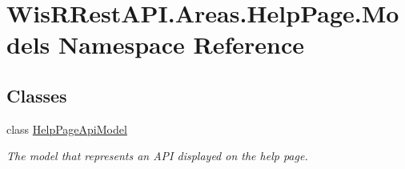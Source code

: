 \hypertarget{namespace_wis_r_rest_a_p_i_1_1_areas_1_1_help_page_1_1_models}{}\section{Wis\+R\+Rest\+A\+P\+I.\+Areas.\+Help\+Page.\+Models Namespace Reference}
\label{namespace_wis_r_rest_a_p_i_1_1_areas_1_1_help_page_1_1_models}
\subsection*{Classes}
\begin{DoxyCompactItemize}
\item 
class \hyperlink{class_wis_r_rest_a_p_i_1_1_areas_1_1_help_page_1_1_models_1_1_help_page_api_model}{Help\+Page\+Api\+Model}
\begin{DoxyCompactList}\small\item\em The model that represents an A\+P\+I displayed on the help page. \end{DoxyCompactList}\end{DoxyCompactItemize}
